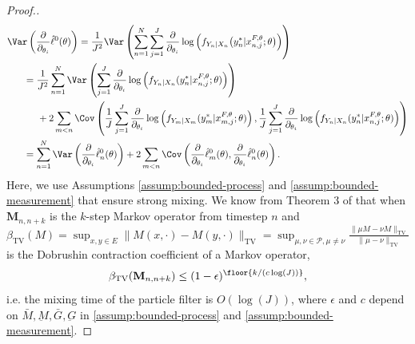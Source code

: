 \begin{proof}[Proof.]
\begin{align}
    \Var\left(\frac{\partial}{\partial_{\theta_i}} \hat\ell^0(\theta)\right) &= \frac{1}{J^2}\Var\left(\sum_{n=1}^N\sum_{j=1}^{J}\frac{\partial}{\partial_{\theta_i}} \log\left(f_{Y_n|X_{n}}\big(y_n^*|x_{n,j}^{F, \theta}; \theta\big)\right)\right) \\
    & \hspace{-20mm}= \frac{1}{J^2}\sum_{n=1}^N\Var\left(\sum_{j=1}^{J}\frac{\partial}{\partial_{\theta_i}} \log\left(f_{Y_n|X_{n}}(y_n^*|x_{n,j}^{F, \theta}; \theta)\right)\right)
\nonumber \\
    &\hspace{-15mm}+ 2\sum_{m<n}\Cov\left(\frac{1}{J}\sum_{j=1}^{J}\frac{\partial}{\partial_{\theta_i}} \log\left(f_{Y_m|X_{m}}(y_m^*|x_{m,j}^{F, \theta}; \theta)\right), \frac{1}{J}\sum_{j=1}^{J}\frac{\partial}{\partial_{\theta_i}} \log\left(f_{Y_n|X_{n}}(y_n^*|x_{n,j}^{F, \theta}; \theta)\right)\right)
\nonumber \\
    &\hspace{-20mm}= \sum_{n=1}^N \Var\left(\frac{\partial}{\partial_{\theta_i}}\hat\ell_n^0(\theta)\right) + 2\sum_{m<n} \Cov\left(\frac{\partial}{\partial_{\theta_i}}\hat\ell_m^0(\theta),\frac{\partial}{\partial_{\theta_i}}\hat\ell_n^0(\theta)\right).
\end{align}
Here, we use Assumptions \ref{assump:bounded-process} and \ref{assump:bounded-measurement} that ensure strong mixing. We know from Theorem 3 of \cite{karjalainen23} that when $\textbf{M}_{n,n+k}$ is the $k$-step Markov operator from timestep $n$ and $\beta_{\text{TV}}(M) = \sup _{x, y \in E}\|M(x, \cdot)-M(y, \cdot)\|_{\mathrm{TV}}=\sup _{\mu, \nu \in \mathcal{P}, \mu \neq \nu} \frac{\|\mu M-\nu M\|_{\mathrm{TV}}}{\|\mu-\nu\|_{\mathrm{TV}}}$ is the Dobrushin contraction coefficient of a Markov operator, 
\begin{equation}
\beta_{\text{TV}}(\textbf{M}_{n,n+k}) \leq (1-\epsilon)^{\floor{k/(c\log(J))}},
\end{equation}
i.e. the mixing time of the particle filter is $O(\log(J))$, where $\epsilon$ and $c$ depend on $\bar{M}, \underbar{M}, \bar{G}, \underbar{G}$ in \ref{assump:bounded-process} and \ref{assump:bounded-measurement}. 



\end{proof}
